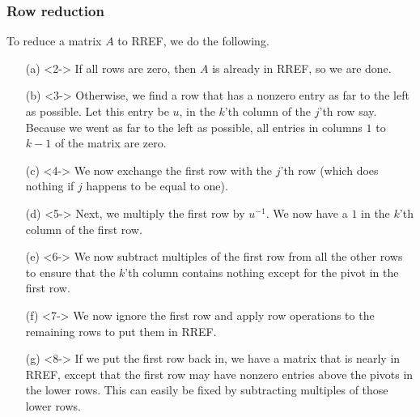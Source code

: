 \documentclass[9pt]{beamer}
\begin{document}
\begin{frame}
 \frametitle{Row reduction}
 
 To reduce a matrix $A$ to RREF, we do the following.
 \begin{itemize}
  \item[(a)]<2-> If all rows are zero, then $A$ is already in RREF, so we
   are done.
  \item[(b)]<3-> Otherwise, we find a row that has a nonzero entry as far
   to the left as possible.  Let this entry be $u$, in the $k$'th
   column of the $j$'th row say.  Because we went as far to the left
   as possible, all entries in columns $1$ to $k-1$ of the matrix are
   zero.
  \item[(c)]<4-> We now exchange the first row with the $j$'th row (which
   does nothing if $j$ happens to be equal to one).
  \item[(d)]<5-> Next, we multiply the first row by $u^{-1}$.  We now have
   a $1$ in the $k$'th column of the first row.
  \item[(e)]<6-> We now subtract multiples of the first row from all the
   other rows to ensure that the $k$'th column contains nothing except
   for the pivot in the first row.
  \item[(f)]<7-> We now ignore the first row and apply row operations to
   the remaining rows to put them in RREF.
  \item[(g)]<8-> If we put the first row back in, we have a matrix that is
   nearly in RREF, except that the first row may have nonzero entries
   above the pivots in the lower rows.  This can easily be fixed by
   subtracting multiples of those lower rows.
 \end{itemize}
\end{frame}
\end{document}
